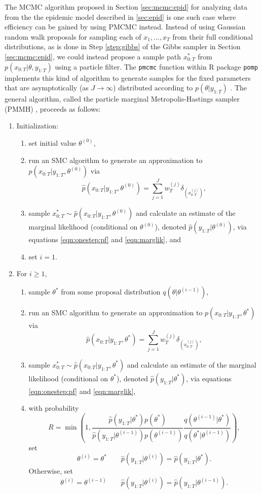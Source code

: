 The MCMC algorithm proposed in Section \ref{sec:mcmc:epid} for analyzing data from the the epidemic model described in \ref{sec:epid} is one such case where efficiency can be gained by using PMCMC instead. Instead of using Gaussian random walk proposals for sampling each of $x_1,\ldots,x_T$ from their full conditional distributions, as is done in Step \ref{step:gibbs} of the Gibbs sampler in Section \ref{sec:mcmc:epid}, we could instead propose a sample path $x_{0:T}^*$ from $p(x_{0:T}|\theta,y_{1:T})$ using a particle filter. The {\tt pmcmc} function within R package {\tt pomp} \citep{pomp} implements this kind of algorithm to generate samples for the fixed parameters that are asymptotically (as $J \rightarrow \infty$) distributed according to $p(\theta|y_{1:T})$ \citep{Andr:Rob:2009:pseudomarg}. The general algorithm, called the particle marginal Metropolis-Hastings sampler (PMMH) \cite[Section 2.4.2][]{Andr:Douc:Hol:pmcmc:2010}, proceeds as follows:
\begin{enumerate}
\item Initialization:
\begin{enumerate}
\item set initial value $\theta^{(0)}$,
\item run an SMC algorithm to generate an approximation to $p(x_{0:T}|y_{1:T},\theta^{(0)})$ via
    \[\hat{p}(x_{0:T}|y_{1:T},\theta^{(0)}) = \sum_{j=1}^J w_T^{(j)} \delta_{\left(x_{0:T}^{(j)}\right)},\]
\item sample $x_{0:T}^* \sim \hat{p}(x_{0:T}|y_{1:T},\theta^{(0)})$ and calculate an estimate of the marginal likelihood (conditional on $\theta^{(0)}$), denoted $\hat{p}(y_{1:T}|\theta^{(0)})$, via equations \eqref{eqn:onestep:pf} and \eqref{eqn:marglik}, and
\item set $i = 1$.
\end{enumerate}
\item For $i \ge 1$,
\begin{enumerate}
\item sample $\theta^*$ from some proposal distribution $q(\theta|\theta^{(i-1)})$,
\item run an SMC algorithm to generate an approximation to $p(x_{0:T}|y_{1:T},\theta^*)$ via
    \[\hat{p}(x_{0:T}|y_{1:T},\theta^*) = \sum_{j=1}^J w_T^{(j)} \delta_{\left(x_{0:T}^{(j)}\right)},\]
\item sample $x_{0:T}^* \sim \hat{p}(x_{0:T}|y_{1:T},\theta^*)$ and calculate an estimate of the marginal likelihood (conditional on $\theta^*$), denoted $\hat{p}(y_{1:T}|\theta^*)$, via equations \eqref{eqn:onestep:pf} and \eqref{eqn:marglik},
\item with probability
    \[R = \min\left(1, \frac{\hat{p}(y_{1:T}|\theta^*)p(\theta^*)}{\hat{p}(y_{1:T}|\theta^{(i-1)})p(\theta^{(i-1)})} \frac{q(\theta^{(i-1)}|\theta^*)}{q(\theta^*|\theta^{(i-1)})} \right),\]
    set 
    \[\theta^{(i)} = \theta^* \qquad \hat{p}(y_{1:T}|\theta^{(i)}) = \hat{p}(y_{1:T}|\theta^*).\]
    Otherwise, set
    \[\theta^{(i)} = \theta^{(i-1)} \qquad \hat{p}(y_{1:T}|\theta^{(i)}) = \hat{p}(y_{1:T}|\theta^{(i-1)}).\] 
\end{enumerate}
\end{enumerate}

